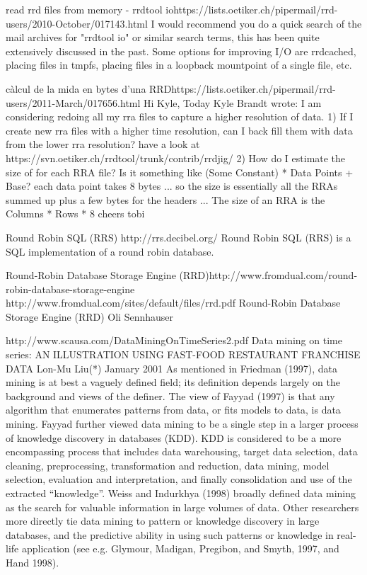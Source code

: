 read rrd files from memory - rrdtool io
​https://lists.oetiker.ch/pipermail/rrd-users/2010-October/017143.html
I would recommend you do a quick search of the mail archives for
"rrdtool io" or similar search terms, this has been quite extensively
discussed in the past. Some options for improving I/O are rrdcached,
placing files in tmpfs, placing files in a loopback mountpoint of a
single file, etc.


càlcul de la mida en bytes d'una RRD
​https://lists.oetiker.ch/pipermail/rrd-users/2011-March/017656.html
Hi Kyle,
Today Kyle Brandt wrote:
I am considering redoing all my rra files to capture a higher
resolution of data.
1) If I create new rra files with a higher time resolution, can I back
fill them with data from the lower rra resolution?
have a look at ​https://svn.oetiker.ch/rrdtool/trunk/contrib/rrdjig/
2) How do I estimate the size of for each RRA file? Is it something
like (Some Constant) * Data Points + Base?
each data point takes 8 bytes ... so the size is essentially
all the RRAs summed up plus a few bytes for the headers ...
The size of an RRA is the Columns * Rows * 8
cheers
tobi



Round Robin SQL (RRS)
​http://rrs.decibel.org/
Round Robin SQL (RRS) is a SQL implementation of a round robin database. 

Round-Robin Database Storage Engine (RRD)
​http://www.fromdual.com/round-robin-database-storage-engine
​http://www.fromdual.com/sites/default/files/rrd.pdf
Round-Robin Database Storage Engine (RRD)
Oli Sennhauser


​http://www.scausa.com/DataMiningOnTimeSeries2.pdf
Data mining on time series:
AN ILLUSTRATION USING FAST-FOOD RESTAURANT FRANCHISE DATA
Lon-Mu Liu(*)
January 2001
As mentioned in Friedman (1997), data
mining is at best a vaguely defined field; its definition depends largely on the background and views
of the definer. The view of Fayyad (1997) is that any algorithm that enumerates patterns from data,
or fits models to data, is data mining. Fayyad further viewed data mining to be a single step in a
larger process of knowledge discovery in databases (KDD). KDD is considered to be a more
encompassing process that includes data warehousing, target data selection, data cleaning,
preprocessing, transformation and reduction, data mining, model selection, evaluation and
interpretation, and finally consolidation and use of the extracted “knowledge”. Weiss and Indurkhya
(1998) broadly defined data mining as the search for valuable information in large volumes of data.
Other researchers more directly tie data mining to pattern or knowledge discovery in large databases,
and the predictive ability in using such patterns or knowledge in real-life application (see e.g.
Glymour, Madigan, Pregibon, and Smyth, 1997, and Hand 1998).



